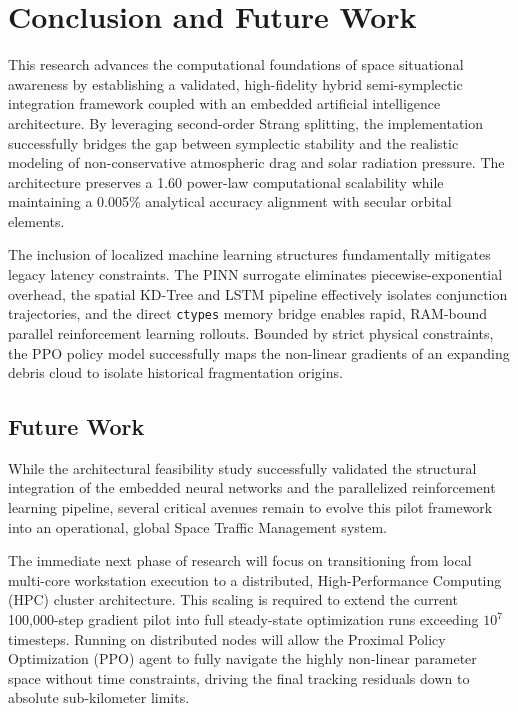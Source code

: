 \documentclass[letterpaper,11pt]{AAS}
\begin{document}
\section{Conclusion and Future Work}
\label{sec:conclusion_and_future_work}

This research advances the computational foundations of space situational awareness by establishing a validated, high-fidelity hybrid semi-symplectic integration framework coupled with an embedded artificial intelligence architecture. By leveraging second-order Strang splitting, the implementation successfully bridges the gap between symplectic stability and the realistic modeling of non-conservative atmospheric drag and solar radiation pressure. The architecture preserves a 1.60 power-law computational scalability while maintaining a 0.005\% analytical accuracy alignment with secular orbital elements.

The inclusion of localized machine learning structures fundamentally mitigates legacy latency constraints. The PINN surrogate eliminates piecewise-exponential overhead, the spatial KD-Tree and LSTM pipeline effectively isolates conjunction trajectories, and the direct \texttt{ctypes} memory bridge enables rapid, RAM-bound parallel reinforcement learning rollouts. Bounded by strict physical constraints, the PPO policy model successfully maps the non-linear gradients of an expanding debris cloud to isolate historical fragmentation origins.

\subsection{Future Work}
While the architectural feasibility study successfully validated the structural integration of the embedded neural networks and the parallelized reinforcement learning pipeline, several critical avenues remain to evolve this pilot framework into an operational, global Space Traffic Management system. 

The immediate next phase of research will focus on transitioning from local multi-core workstation execution to a distributed, High-Performance Computing (HPC) cluster architecture. This scaling is required to extend the current 100,000-step gradient pilot into full steady-state optimization runs exceeding $10^7$ timesteps. Running on distributed nodes will allow the Proximal Policy Optimization (PPO) agent to fully navigate the highly non-linear parameter space without time constraints, driving the final tracking residuals down to absolute sub-kilometer limits.
\end{document}

